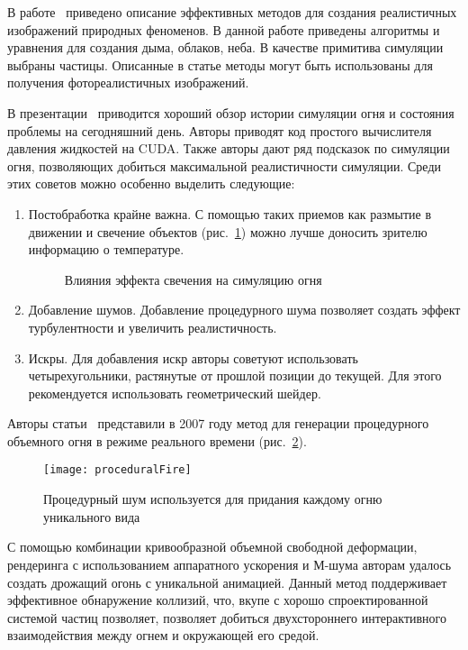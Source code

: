 В работе~\cite{NaturalPhenomena} приведено описание эффективных методов для
создания реалистичных изображений природных феноменов. В данной работе приведены
алгоритмы и уравнения для создания дыма, облаков, неба. В качестве примитива
симуляции выбраны частицы. Описанные в статье методы могут быть использованы для
получения фотореалистичных изображений.

В презентации~\cite{RealTimeNVIDIA} приводится хороший обзор истории симуляции
огня и состояния проблемы на сегодняшний день. Авторы приводят код простого
вычислителя давления жидкостей на CUDA\@. Также авторы дают ряд подсказок по
симуляции огня, позволяющих добиться максимальной реалистичности симуляции.
Среди этих советов можно особенно выделить следующие:
\begin{enumerate}
    \item Постобработка крайне важна. С помощью таких приемов как размытие в
        движении и свечение объектов (рис.~\ref{fig:GlowEffect}) можно лучше
        доносить зрителю информацию о температуре.
    \begin{figure}[htb]
        \centering
        \qquad
        \caption{Влияния эффекта свечения на симуляцию огня}%
        \label{fig:GlowEffect}%
    \end{figure}
    \item Добавление шумов. Добавление процедурного шума позволяет создать
        эффект турбулентности и увеличить реалистичность.
    \item Искры. Для добавления искр авторы советуют использовать
        четырехугольники, растянутые от прошлой позиции до текущей. Для этого
        рекомендуется использовать геометрический шейдер.
\end{enumerate}

Авторы статьи~\cite{RealTimeVolumetric} представили в 2007 году метод для
генерации процедурного объемного огня в режиме реального времени
(рис.~\ref{fig:proceduralFire}).
\begin{figure}[htb]
	\centering
    \texttt{[image: proceduralFire]}
    \caption{Процедурный шум используется для придания каждому огню уникального
    вида}%
    \label{fig:proceduralFire}
\end{figure}
С помощью комбинации кривообразной объемной свободной деформации, рендеринга с
использованием аппаратного ускорения и М-шума авторам удалось создать дрожащий
огонь с уникальной анимацией. Данный метод поддерживает эффективное обнаружение
коллизий, что, вкупе с хорошо спроектированной системой частиц позволяет,
позволяет добиться двухстороннего интерактивного взаимодействия между огнем и
окружающей его средой.

